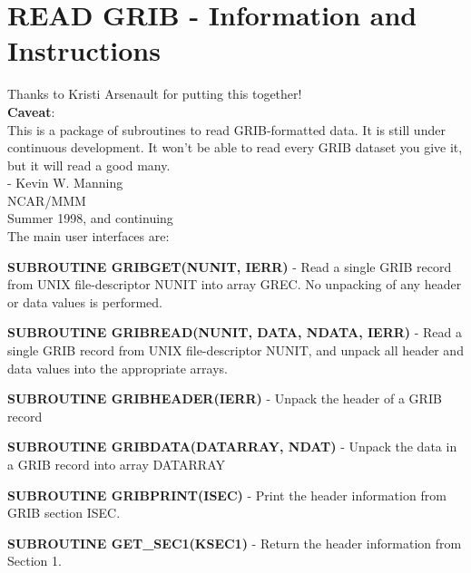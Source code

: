 
\section{READ GRIB - Information and Instructions} \label{sec:readgrib_appendix}
Thanks to Kristi Arsenault for putting this together!\\

\textbf{Caveat}: \\
This is a package of subroutines to read GRIB-formatted data.  It is still under continuous development.  It won't be able to read every GRIB dataset you give it, but it will read a good many. \\
                                                                            
  - Kevin W. Manning \\
   NCAR/MMM        \\
   Summer 1998, and continuing \\

The main user interfaces are:    

\textbf{SUBROUTINE GRIBGET(NUNIT, IERR)}
 - Read a single GRIB record from UNIX file-descriptor NUNIT into array GREC. No unpacking of any header or data values is performed. 
                                                          
\textbf{SUBROUTINE GRIBREAD(NUNIT, DATA, NDATA, IERR)}
      - Read a single GRIB record from UNIX file-descriptor NUNIT, and unpack  
        all header and data values into the appropriate arrays.                
                                                                             
\textbf{SUBROUTINE GRIBHEADER(IERR) }                    
      - Unpack the header of a GRIB record                                 
                                                                            
\textbf{SUBROUTINE GRIBDATA(DATARRAY, NDAT)}
      - Unpack the data in a GRIB record into array DATARRAY               
                                                                             
\textbf{SUBROUTINE GRIBPRINT(ISEC)}
      - Print the header information from GRIB section ISEC.                  
                                                                            
\textbf{SUBROUTINE GET\_SEC1(KSEC1) }                                              
      - Return the header information from Section 1.                         
                                                                            
